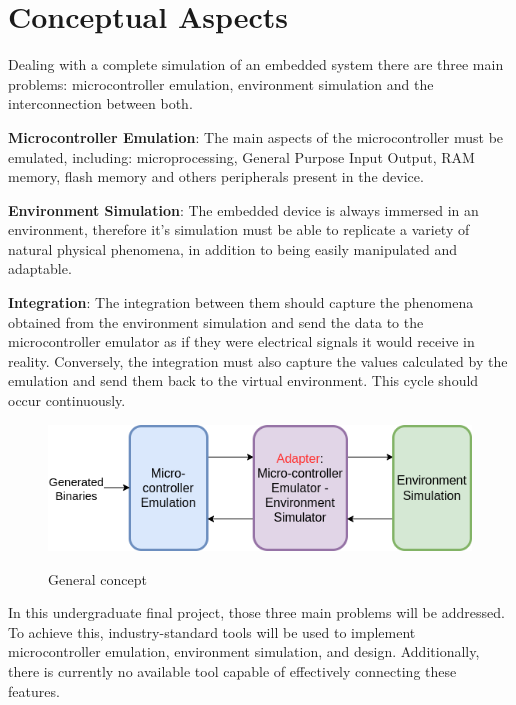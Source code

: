 \documentclass[../monografia.tex]{subfiles}
\begin{document}
\chapter{Conceptual Aspects}
\label{chapter: Conceptual Aspects}

Dealing with a complete simulation of an embedded system there are three main problems: microcontroller emulation, environment simulation and the interconnection between both.

\textbf{Microcontroller Emulation}: The main aspects of the microcontroller must be emulated, including: microprocessing, General Purpose Input Output, RAM memory, flash memory  and others peripherals present in the device.

\textbf{Environment Simulation}: The embedded device is always immersed in an environment, therefore it's simulation must be able to replicate a variety of natural physical phenomena, in addition to being easily manipulated and adaptable.

\textbf{Integration}: The integration between them should capture the phenomena obtained from the environment simulation and send the data to the microcontroller emulator as if they were electrical signals it would receive in reality. Conversely, the integration must also capture the values calculated by the emulation and send them back to the virtual environment. This cycle should occur continuously.

\begin{figure}[h!]
    \caption{General concept}
    \centering %
    \includegraphics[width=14cm]{General concept.png}
    \label{fig: General concept}
\end{figure}

In this undergraduate final project, those three main problems will be addressed. To achieve this, industry-standard tools will be used to implement microcontroller emulation, environment simulation, and design. Additionally, there is currently no available tool capable of effectively connecting these features.

\end{document}
